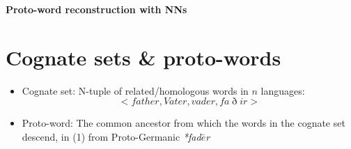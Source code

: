 \documentclass[a4paper, 10pt]{article}
\begin{document}
\begin{center}
    \Huge
    \textbf{Proto-word reconstruction with NNs}
\end{center}
\section*{Cognate sets \& proto-words}
\begin{itemize}
    \item Cognate set: N-tuple of related/homologous words in $n$ languages:
    \begin{equation}
        <father,Vater,vader,fa\eth ir>
    \end{equation}
    \item Proto-word: The common ancestor from which the words in the cognate set descend, in (1) from Proto-Germanic \textit{*fad$\bar{e}$r}
\end{itemize}
\end{document}
